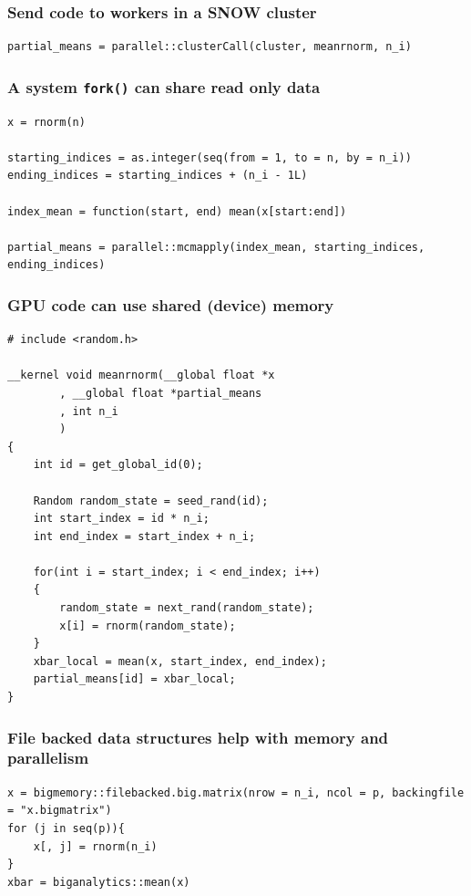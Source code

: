 \documentclass{beamer}
\begin{document}
\begin{frame}[fragile]

    \frametitle{Send code to workers in a SNOW cluster}

\begin{verbatim}
partial_means = parallel::clusterCall(cluster, meanrnorm, n_i)
\end{verbatim}

\end{frame}
\begin{frame}[fragile]

    \frametitle{A system \texttt{fork()} can share read only data}

\begin{verbatim}
x = rnorm(n)

starting_indices = as.integer(seq(from = 1, to = n, by = n_i))
ending_indices = starting_indices + (n_i - 1L)

index_mean = function(start, end) mean(x[start:end])

partial_means = parallel::mcmapply(index_mean, starting_indices, ending_indices)
\end{verbatim}

\end{frame}
\begin{frame}[fragile]

    \frametitle{GPU code can use shared (device) memory}

\begin{verbatim}
# include <random.h>

__kernel void meanrnorm(__global float *x
        , __global float *partial_means
        , int n_i
        )
{
    int id = get_global_id(0);

    Random random_state = seed_rand(id);
    int start_index = id * n_i;
    int end_index = start_index + n_i;

    for(int i = start_index; i < end_index; i++)
    {
        random_state = next_rand(random_state);
        x[i] = rnorm(random_state);
    }
    xbar_local = mean(x, start_index, end_index);
    partial_means[id] = xbar_local;
}
\end{verbatim}

\end{frame}
\begin{frame}[fragile]

    \frametitle{File backed data structures help with memory and
    parallelism}

\begin{verbatim}
x = bigmemory::filebacked.big.matrix(nrow = n_i, ncol = p, backingfile = "x.bigmatrix")
for (j in seq(p)){
    x[, j] = rnorm(n_i)
}
xbar = biganalytics::mean(x)
\end{verbatim}


\end{frame}
\end{document}
